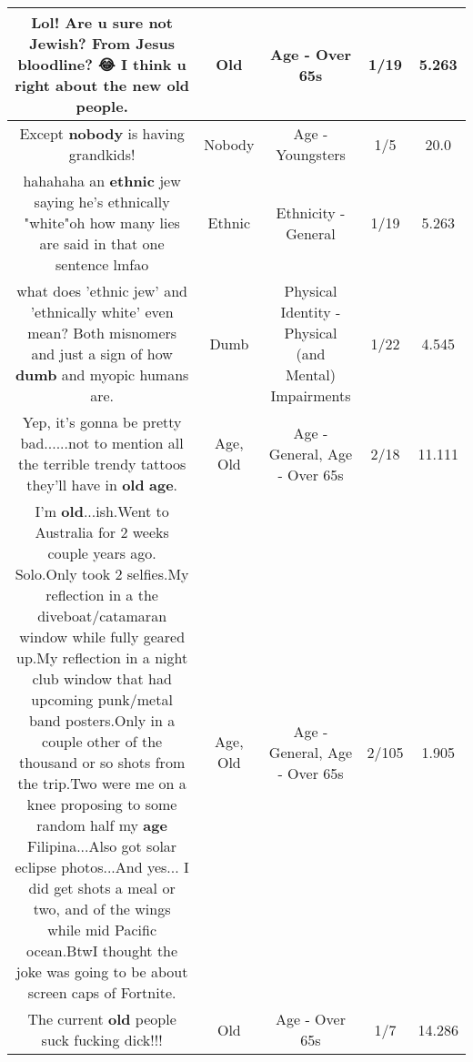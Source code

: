 \documentclass[11pt]{article}
\newlength\mylength
\begin{document}
\begin{center}
\begin{longtable}{|C{.65\mylength}|C{.30\mylength}|C{.12\mylength}|C{.12\mylength}|C{.12\mylength}|}
  \small Lol! Are u sure not Jewish? From Jesus bloodline? 😂 I think u right about the new \textbf{old} people.\normalsize   & Old & Age - Over 65s & 1/19 & 5.263 \\  \hline
  \small Except \textbf{nobody} is having grandkids!\normalsize   & Nobody & Age - Youngsters & 1/5 & 20.0 \\  \hline
  \small hahahaha an \textbf{ethnic} jew saying he's ethnically "white"oh how many lies are said in that one sentence lmfao\normalsize   & Ethnic & Ethnicity - General & 1/19 & 5.263 \\  \hline
  \small what does 'ethnic jew' and 'ethnically white' even mean?  Both misnomers and just a sign of how \textbf{dumb} and myopic humans are.\normalsize   & Dumb & Physical Identity - Physical (and Mental) Impairments & 1/22 & 4.545 \\  \hline
  \small Yep, it's gonna be pretty bad......not to mention all the terrible trendy tattoos they'll have in \textbf{old} \textbf{age}.\normalsize   & Age, Old & Age - General, Age - Over 65s & 2/18 & 11.111 \\  \hline
  \small I'm \textbf{old}...ish.Went to Australia for 2 weeks couple years ago. Solo.Only took 2 selfies.My reflection in a the diveboat/catamaran window while fully geared up.My reflection in a night club window that had upcoming punk/metal band posters.Only in a couple other of the thousand or so shots from the trip.Two were me on a knee proposing to some random half my \textbf{age} Filipina...Also got solar eclipse photos...And yes... I did get shots a meal or two, and of the wings while mid Pacific ocean.BtwI thought the joke was going to be about screen caps of Fortnite.\normalsize   & Age, Old & Age - General, Age - Over 65s & 2/105 & 1.905 \\  \hline
  \small The current \textbf{old} people suck fucking dick!!!\normalsize   & Old & Age - Over 65s & 1/7 & 14.286 \\  \hline

\end{longtable}
\end{center}
\end{document}
